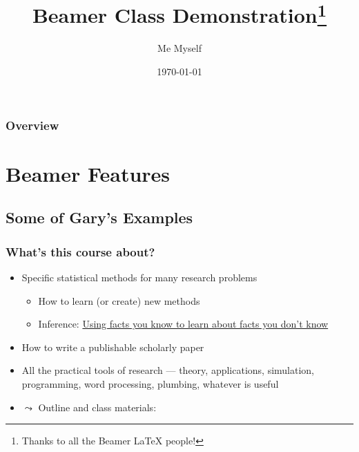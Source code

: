 \documentclass[11pt]{beamer}
\title[Beamer Demo]{Beamer Class Demonstration\thanks{Thanks to all the Beamer LaTeX people!}}
\author{Me Myself}
\date{\today}
\institute{IQSS}
\begin{document}
\begin{frame}
  \maketitle
\end{frame}

\begin{frame}
  \frametitle{Overview}
  \tableofcontents
\end{frame}

\section{Beamer Features}


\subsection{Some of Gary's Examples}

\begin{frame}\frametitle{What's this course about?}
  \begin{itemize}
  \item \alert{Specific statistical methods for many research problems}
    \begin{itemize}
    \item How to learn (or create) new methods
    \item Inference: \underline{Using facts you know to learn about
        facts you don't know}
    \end{itemize}
  \item \alert{How to write a publishable scholarly paper}
  \item \alert{All the practical tools of research} --- theory,
    applications, simulation, programming, word processing, plumbing,
    whatever is useful
  \item $\leadsto$ \alert{Outline and class materials:}
  \end{itemize}
\end{frame}
\end{document}
